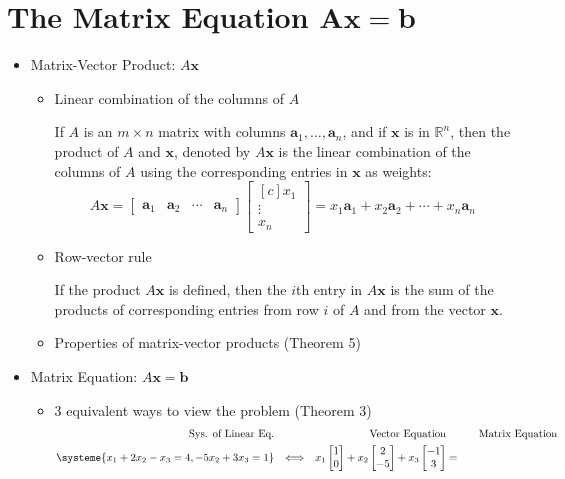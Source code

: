 \documentclass[10pt]{book}
\newenvironment{boxdef}{\begin{mdframed}[backgroundcolor=gray!30,linewidth=0pt,nobreak=true]}{\end{mdframed}}
\newcommand{\R}{\mathbb{R}}
\newcommand{\vect}[1]{\ensuremath{\boldsymbol{\mathbf{#1}}}}
\begin{document}
\section{The Matrix Equation $\boldsymbol{Ax=b}$}
\begin{itemize}
	\item Matrix-Vector Product: $A\vect{x}$
		\begin{itemize}
			\item Linear combination of the columns of $A$
			\begin{boxdef}
				If $A$ is an $m\times n$ matrix with columns $\vect{a}_1,\ldots,\vect{a}_n$, and if $\vect{x}$ is in $\R^n$, then the product of $A$ and $\vect{x}$, denoted by $A\vect{x}$ is the linear combination of the columns of $A$ using the corresponding entries in $\vect{x}$ as weights:
				$$ A\vect{x} =
				\begin{bmatrix}\vect{a}_1&\vect{a}_2&\cdots&\vect{a}_n\end{bmatrix}
				\begin{bmatrix}[c]x_1\\\vdots\\x_n\end{bmatrix} =
				x_1\vect{a}_1 + x_2\vect{a}_2 + \cdots + x_n\vect{a}_n $$
			\end{boxdef}
			\item Row-vector rule
			\begin{boxdef}
				If the product $A\vect{x}$ is defined, then the $i$th entry in $A\vect{x}$ is the sum of the products of corresponding entries from row $i$ of $A$ and from the vector $\vect{x}$.
			\end{boxdef}
			\item Properties of matrix-vector products (Theorem 5)
		\end{itemize}
	\item Matrix Equation: $A\vect{x}=\vect{b}$
		\begin{itemize}
			\item 3 equivalent ways to view the problem (Theorem 3)
			\begin{align*}
			\text{Sys. of Linear Eq.}&&&&
			\text{Vector Equation}&&&&
			\text{Matrix Equation} \\
			\systeme{x_1+2x_2-x_3=4,-5x_2+3x_3=1}&
			&\Longleftrightarrow&&
			x_1\begin{bmatrix}1\\0\end{bmatrix} + x_2\begin{bmatrix}2\\-5\end{bmatrix} + x_3\begin{bmatrix}-1\\3\end{bmatrix} &=

\end{align*}
\end{itemize}
\end{itemize}
\end{document}

